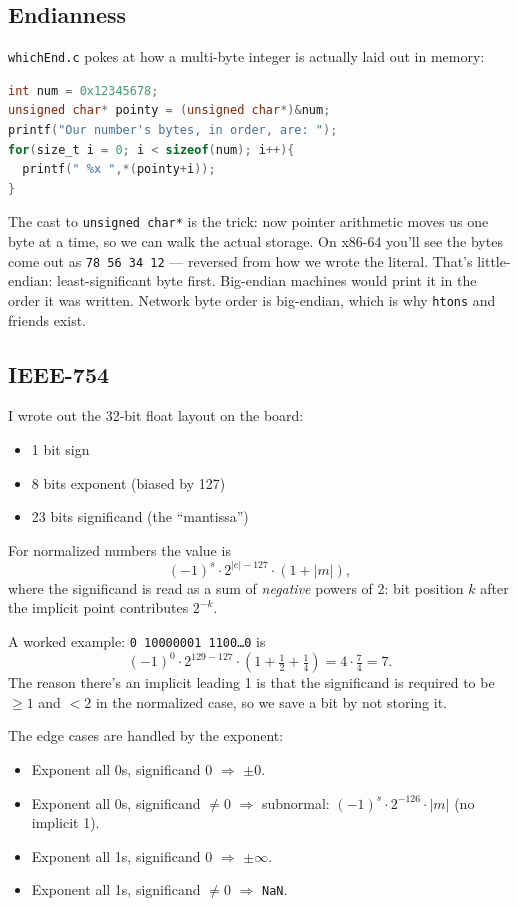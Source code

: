 \documentclass[11pt]{article}
\begin{document}
\subsection*{Endianness}

\texttt{whichEnd.c} pokes at how a multi-byte integer is actually
laid out in memory:

\begin{lstlisting}[language=C]
int num = 0x12345678;
unsigned char* pointy = (unsigned char*)&num;
printf("Our number's bytes, in order, are: ");
for(size_t i = 0; i < sizeof(num); i++){
  printf(" %x ",*(pointy+i));
}
\end{lstlisting}

The cast to \texttt{unsigned char*} is the trick: now pointer
arithmetic moves us one byte at a time, so we can walk the actual
storage. On x86-64 you'll see the bytes come out as \texttt{78 56 34
12} --- reversed from how we wrote the literal. That's
little-endian: least-significant byte first. Big-endian machines
would print it in the order it was written. Network byte order is
big-endian, which is why \texttt{htons} and friends exist.

\subsection*{IEEE-754}

I wrote out the 32-bit float layout on the board:
\begin{itemize}
  \item 1 bit sign
  \item 8 bits exponent (biased by 127)
  \item 23 bits significand (the ``mantissa'')
\end{itemize}

For normalized numbers the value is
\[
  (-1)^s \cdot 2^{|e| - 127} \cdot (1 + |m|),
\]
where the significand is read as a sum of \emph{negative} powers of
2: bit position $k$ after the implicit point contributes $2^{-k}$.

A worked example: \texttt{0 10000001 1100\ldots0} is
\[
  (-1)^0 \cdot 2^{129 - 127} \cdot (1 + \tfrac12 + \tfrac14)
  = 4 \cdot \tfrac{7}{4} = 7.
\]
The reason there's an implicit leading 1 is that the significand is
required to be $\ge 1$ and $< 2$ in the normalized case, so we save
a bit by not storing it.

The edge cases are handled by the exponent:
\begin{itemize}
  \item Exponent all 0s, significand 0 $\Rightarrow$ $\pm 0$.
  \item Exponent all 0s, significand $\ne 0$ $\Rightarrow$
    subnormal: $(-1)^s \cdot 2^{-126} \cdot |m|$ (no implicit 1).
  \item Exponent all 1s, significand 0 $\Rightarrow$ $\pm \infty$.
  \item Exponent all 1s, significand $\ne 0$ $\Rightarrow$
    \texttt{NaN}.
\end{itemize}
\end{document}
